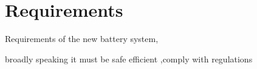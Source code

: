 \chapter*{Requirements}

Requirements of the new battery system,

broadly speaking it must be safe efficient ,comply with regulations 
